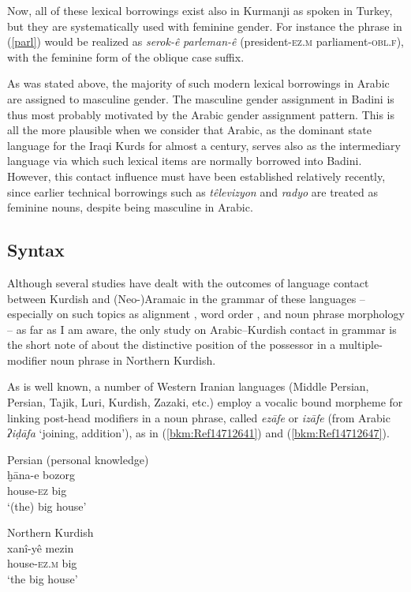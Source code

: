 \documentclass[output=paper]{langsci/langscibook}
\begin{document}
Now, all of these lexical borrowings exist also in Kurmanji as spoken in Turkey, but they are systematically used with feminine gender. For instance the phrase in (\ref{parl}) would be realized as \textit{serok-ê} \textit{parleman-ê} (president-\textsc{ez.m} parliament-\textsc{obl.f}), with the feminine form of the oblique case suffix. 

As was stated above, the majority of such modern lexical borrowings in Arabic are assigned to masculine gender. The masculine gender assignment in Badini is thus most probably motivated by the Arabic gender assignment pattern. This is all the more plausible when we consider that Arabic, as the dominant state language for the Iraqi Kurds for almost a century, serves also as the intermediary language via which such lexical items are normally borrowed into Badini. However, this contact influence must have been established relatively recently, since earlier technical borrowings such as \textit{têlevizyon} and \textit{radyo} are treated as feminine nouns, despite being masculine in Arabic.  

\subsection{\label{bkm:Ref520275931} Syntax}

Although several studies have dealt with the outcomes of language contact between Kurdish and (Neo-)Aramaic in the grammar of these languages – especially on such topics as alignment \citep{Coghill2016}, word order \citep{Haig2014}, and noun phrase morphology \citep{Noorlander2014} – as far as I am aware, the only study on Arabic–Kurdish contact in grammar is the short note of \citet{Tsabolov1994} about the distinctive position of the possessor in a multiple-modifier noun phrase in Northern Kurdish. 

As is well known, a number of Western Iranian languages (Middle Persian, Persian, Tajik, Luri, Kurdish, Zazaki, etc.) employ a vocalic bound morpheme for linking post-head modifiers in a noun phrase, called \textit{ezāfe} or \textit{izāfe} (from Arabic \textit{ʔiḍāfa} ‘joining, addition’), as in (\ref{bkm:Ref14712641}) and (\ref{bkm:Ref14712647}). 

\ea\label{bkm:Ref14712641}Persian (personal knowledge)\\
\gll ḫāna-e bozorg\\
     house-\textsc{ez} big\\
\glt ‘(the) big house’
\z

\ea\label{bkm:Ref14712647}Northern Kurdish\\
\gll xanî-yê mezin\\
     house-\textsc{ez.m} big\\
\glt ‘the big house’
\z
\end{document}
